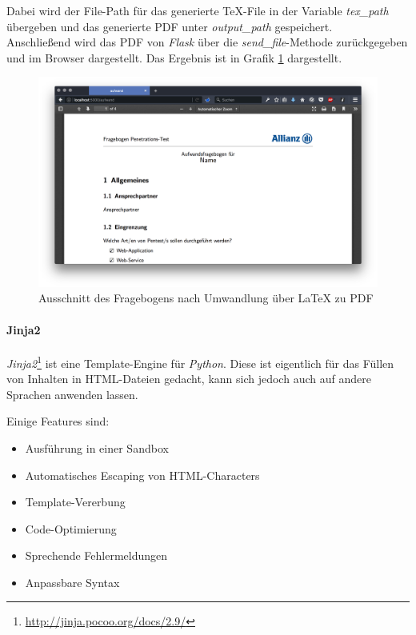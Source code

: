Dabei wird der File-Path für das generierte TeX-File in der Variable \textit{tex\_path} übergeben und das generierte PDF unter \textit{output\_path} gespeichert.\\

Anschließend wird das PDF von \textit{Flask} über die \textit{send\_file}-Methode zurückgegeben und im Browser dargestellt. Das Ergebnis ist in Grafik \ref{fig:FragWebGen} dargestellt.

\begin{figure}[htbp]
	\centering
	\includegraphics[width=\textwidth]{bilder/pentest_prozesse/vorbereitung/fragebogen_web_gen.png}
	\caption{Ausschnitt des Fragebogens nach Umwandlung über LaTeX zu PDF}
	\label{fig:FragWebGen}
\end{figure}

\newpage
\paragraph{Jinja2}\label{jinja2}
\textit{Jinja2}\footnote{\url{http://jinja.pocoo.org/docs/2.9/}} ist eine Template-Engine für \textit{Python}. Diese ist eigentlich für das Füllen von Inhalten in HTML-Dateien gedacht, kann sich jedoch auch auf andere Sprachen anwenden lassen.

Einige Features sind:
\begin{itemize}
    \item Ausführung in einer Sandbox
    \item Automatisches Escaping von HTML-Characters
    \item Template-Vererbung
    \item Code-Optimierung
    \item Sprechende Fehlermeldungen
    \item Anpassbare Syntax
\end{itemize}

